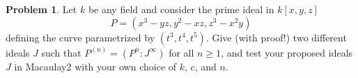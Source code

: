 \documentclass[11pt]{article}
\theoremstyle{definition}
\newtheorem{problem}{Problem}
\begin{document}
\begin{problem}
	Let $k$ be any field and consider the prime ideal in $k[x,y,z]$
	$$P = (x^3-yz,y^2-xz,z^3-x^2y)$$
	defining the curve parametrized by $(t^3, t^4, t^5)$. Give (with proof!) two different ideals $J$ such that $P^{(n)} = (P^n : J^\infty)$ for all $n \geqslant 1$, and test your proposed ideals $J$ in Macaulay2 with your own choice of $k$, $c$, and $n$.
\end{problem}
\end{document}
